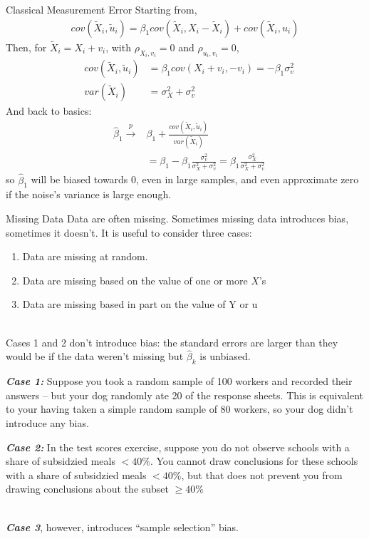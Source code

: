 \documentclass[notes,10pt, aspectratio=169]{beamer}
\begin{document}
\begin{frame}{Classical Measurement Error}
Starting from,
\begin{eqnarray*}
    cov(\tilde{X}_i, \tilde{u}_i) = \beta_1 cov(\tilde{X}_i, X_i-\tilde{X}_i) + cov(\tilde{X}_i, u_i)
\end{eqnarray*}
Then, for $\tilde{X}_i=X_i+v_i$,  with $\rho_{X_i, v_i}=0$ and $\rho_{u_i, v_i}=0$,
\begin{eqnarray*}
        &cov(\tilde{X}_i, \tilde{u}_i) &= \beta_1 cov(X_i+v_i, -v_i)=-\beta_1\sigma_v^2\\
        &var(\tilde{X}_i)&=\sigma_X^2 + \sigma_v^2
\end{eqnarray*}
And back to basics:
\begin{eqnarray*}
        &\hat{\beta}_1 \overset{p}{\to} & \beta_1 + \frac{cov(\tilde{X}_i, \tilde{u}_i)}{var(\tilde{X}_i)}\\
        & {} &= \beta_1 -\beta_1\frac{\sigma_v^2}{\sigma_X^2 + \sigma_v^2} = \beta_1  \frac{\sigma_X^2}{\sigma_X^2 + \sigma_v^2}
\end{eqnarray*}
so $\hat{\beta}_1$ will be biased towards 0, even in large samples, and even approximate zero if the noise's variance is large enough.
\end{frame}

\begin{frame}{Missing Data}
Data are often missing. Sometimes missing data introduces bias, sometimes it doesn’t. It is useful to consider three cases:
\begin{enumerate}
    \item Data are missing at random.
    \item Data are missing based on the value of one or more $X$’s
    \item Data are missing based in part on the value of Y or u
\end{enumerate}
\\[1em]
Cases 1 and 2 don’t introduce bias: the standard errors are larger than they would be if the data weren’t missing but $\hat{\beta}_k$ is unbiased.
\begin{itemize}
    \item {\small \textbf{\textit{Case 1:}} Suppose you took a random sample of 100 workers and recorded their answers -- but your dog randomly ate 20 of the response sheets. This is equivalent to your having taken a simple random sample of 80 workers, so your dog didn’t introduce any bias.
    \item {\small \textbf{\textit{Case 2:}} In the test scores exercise, suppose you do not observe schools with a share of subsidzied meals $<40\%$. You cannot draw conclusions for these schools with a share of subsidzied meals $<40\%$, but that does not prevent you from drawing conclusions about the subset $\geq 40\%$
}
}
\end{itemize}\\[1em]
\textbf{\textit{Case 3}}, however, introduces “sample selection” bias.

\end{frame}
\end{document}
